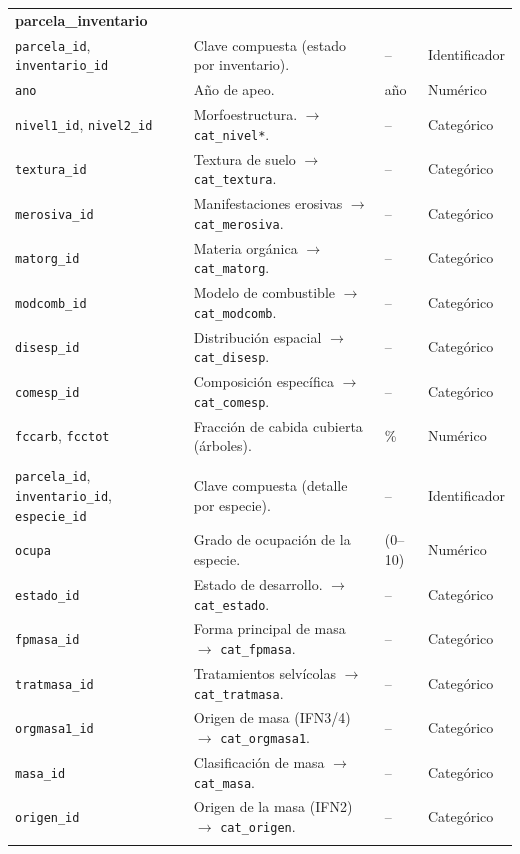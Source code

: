 \begin{longtable}{p{3.2cm} p{7.6cm} p{2.4cm} p{2.4cm}}
\multicolumn{4}{l}{\textbf{parcela\_inventario}} \\
\texttt{parcela\_id}, \texttt{inventario\_id} & Clave compuesta (estado por inventario). & -- & Identificador \\
\texttt{ano} & Año de apeo. & año & Numérico \\
\texttt{nivel1\_id}, \texttt{nivel2\_id} & Morfoestructura. $\rightarrow$ \texttt{cat\_nivel*}. & -- & Categórico \\
\texttt{textura\_id} & Textura de suelo $\rightarrow$ \texttt{cat\_textura}. & -- & Categórico \\
\texttt{merosiva\_id} & Manifestaciones erosivas $\rightarrow$ \texttt{cat\_merosiva}. & -- & Categórico \\
\texttt{matorg\_id} & Materia orgánica $\rightarrow$ \texttt{cat\_matorg}. & -- & Categórico \\
\texttt{modcomb\_id} & Modelo de combustible $\rightarrow$ \texttt{cat\_modcomb}. & -- & Categórico \\
\texttt{disesp\_id} & Distribución espacial $\rightarrow$ \texttt{cat\_disesp}. & -- & Categórico \\
\texttt{comesp\_id} & Composición específica $\rightarrow$ \texttt{cat\_comesp}. & -- & Categórico \\
\texttt{fccarb}, \texttt{fcctot} & Fracción de cabida cubierta (árboles). & \% & Numérico \\
\addlinespace

\multicolumn{4}{l}{\textbf{parcela\_inventario\_especie}} \\
\texttt{parcela\_id}, \texttt{inventario\_id}, \texttt{especie\_id} & Clave compuesta (detalle por especie). & -- & Identificador \\
\texttt{ocupa} & Grado de ocupación de la especie. & (0--10) & Numérico \\
\texttt{estado\_id} & Estado de desarrollo. $\rightarrow$ \texttt{cat\_estado}. & -- & Categórico \\
\texttt{fpmasa\_id} & Forma principal de masa $\rightarrow$ \texttt{cat\_fpmasa}. & -- & Categórico \\
\texttt{tratmasa\_id} & Tratamientos selvícolas $\rightarrow$ \texttt{cat\_tratmasa}. & -- & Categórico \\
\texttt{orgmasa1\_id} & Origen de masa (IFN3/4)$\rightarrow$ \texttt{cat\_orgmasa1}. & -- & Categórico \\
\texttt{masa\_id} & Clasificación de masa $\rightarrow$ \texttt{cat\_masa}. & -- & Categórico \\
\texttt{origen\_id} & Origen de la masa (IFN2) $\rightarrow$ \texttt{cat\_origen}. & -- & Categórico \\
\addlinespace


\end{longtable}
